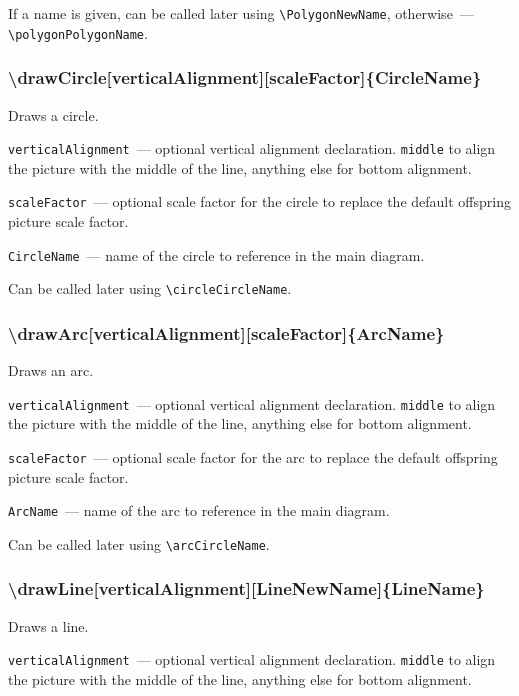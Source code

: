 	If a name is given, can be called later using \texttt{\textbackslash PolygonNewName}, otherwise~— \texttt{\textbackslash polygonPolygonName}. 
	
\subsubsection{\textbackslash drawCircle[verticalAlignment][scaleFactor]\{CircleName\}}

	Draws a circle.

	\texttt{verticalAlignment}~— optional vertical alignment declaration. \texttt{middle} to align the picture with the middle of the line, anything else for bottom alignment.
	
	\texttt{scaleFactor}~— optional scale factor for the circle to replace the default offspring picture scale factor. 
	
	\texttt{CircleName}~— name of the circle to reference in the main diagram. 
	
	Can be called later using \texttt{\textbackslash circleCircleName}.
	
\subsubsection{\textbackslash drawArc[verticalAlignment][scaleFactor]\{ArcName\}}

	Draws an arc.

	\texttt{verticalAlignment}~— optional vertical alignment declaration. \texttt{middle} to align the picture with the middle of the line, anything else for bottom alignment.
	
	\texttt{scaleFactor}~— optional scale factor for the arc to replace the default offspring picture scale factor. 
	
	\texttt{ArcName}~— name of the arc to reference in the main diagram. 
	
	Can be called later using \texttt{\textbackslash arcCircleName}.
	
\subsubsection{\textbackslash drawLine[verticalAlignment][LineNewName]\{LineName\}}

	Draws a line.

	\texttt{verticalAlignment}~— optional vertical alignment declaration. \texttt{middle} to align the picture with the middle of the line, anything else for bottom alignment.
	

